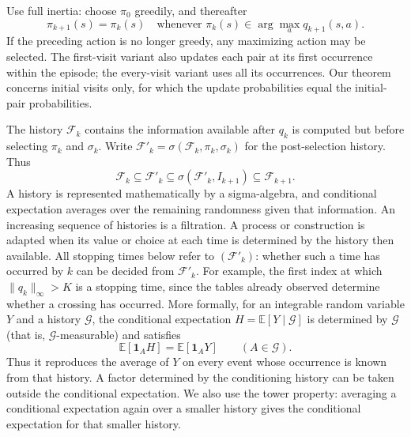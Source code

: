 Use full inertia: choose $\pi_0$ greedily, and thereafter
\begin{equation}\label{eq:greedy-pol-tie-breaking}
\pi_{k+1}(s)=\pi_k(s)\quad\text{whenever }\pi_k(s)\in\arg\max_a q_{k+1}(s,a).
\end{equation}
If the preceding action is no longer greedy, any maximizing action may be selected.
The first-visit variant also updates each pair at its first occurrence within the episode; the every-visit variant uses all its occurrences. Our theorem concerns initial visits only, for which the update probabilities equal the initial-pair probabilities.


The history $\mathcal F_k$ contains the information available after $q_k$ is computed but before selecting $\pi_k$ and $\sigma_k$. Write $\mathcal F'_k=\sigma(\mathcal F_k,\pi_k,\sigma_k)$ for the post-selection history. Thus
\[
\mathcal F_k\subseteq\mathcal F'_k\subseteq\sigma(\mathcal F'_k,I_{k+1})\subseteq\mathcal F_{k+1}.
\]
A history is represented mathematically by a sigma-algebra, and conditional expectation averages over the remaining randomness given that information. An increasing sequence of histories is a filtration. A process or construction is adapted when its value or choice at each time is determined by the history then available. All stopping times below refer to $(\mathcal F'_k)$: whether such a time has occurred by $k$ can be decided from $\mathcal F'_k$. For example, the first index at which $\|q_k\|_\infty>K$ is a stopping time, since the tables already observed determine whether a crossing has occurred. More formally, for an integrable random variable $Y$ and a history $\mathcal G$, the conditional expectation $H=\mathbb E[Y\mid\mathcal G]$ is determined by $\mathcal G$ (that is, $\mathcal G$-measurable) and satisfies
\[
\mathbb E[\mathbf1_AH]=\mathbb E[\mathbf1_AY]\qquad(A\in\mathcal G).
\]
Thus it reproduces the average of $Y$ on every event whose occurrence is known from that history. A factor determined by the conditioning history can be taken outside the conditional expectation. We also use the tower property: averaging a conditional expectation again over a smaller history gives the conditional expectation for that smaller history.

